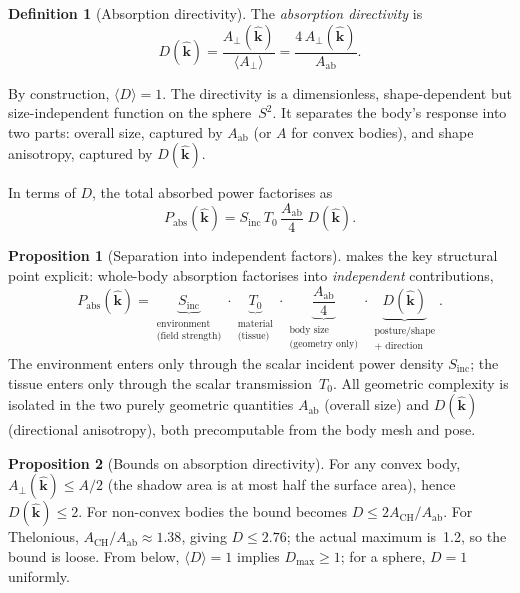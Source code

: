 \documentclass[11pt,a4paper]{article}
\theoremstyle{definition}      %
\newtheorem{proposition}[proposition]{Proposition}
\newtheorem{definition}[definition]{Definition}
\newcommand{\khat}{\hat{\bm{k}}}
\newcommand{\Sinc}{S_{\mathrm{inc}}}
\newcommand{\Aab}{A_{\mathrm{ab}}}
\newcommand{\Aperp}{A_{\perp}}
\begin{document}
\begin{definition}[Absorption directivity]
The \emph{absorption directivity} is
\begin{equation}\label{eq:D-def}
  D(\khat) = \frac{\Aperp(\khat)}{\langle\Aperp\rangle}
  = \frac{4\,\Aperp(\khat)}{\Aab}.
\end{equation}
\end{definition}

By construction, $\langle D\rangle=1$.  The directivity is a
dimensionless, shape-dependent but size-independent function on the
sphere~$S^2$.  It separates the body's response into
two parts: overall size, captured by $\Aab$ (or $A$ for convex bodies), and
shape anisotropy, captured by $D(\khat)$.

In terms of $D$, the total absorbed power factorises as
\begin{equation}\label{eq:Pabs-D}
  \boxed{P_{\mathrm{abs}}(\khat) = \Sinc\,T_0\,
    \frac{\Aab}{4}\;D(\khat).}
\end{equation}

\begin{proposition}[Separation into independent factors]
 makes the key structural point explicit: whole-body
absorption factorises into \emph{independent} contributions,
\[
  P_{\mathrm{abs}}(\khat)
  = \underbrace{\Sinc}_{\substack{\text{environment}\\\text{(field strength)}}}
    \cdot \underbrace{T_0}_{\substack{\text{material}\\\text{(tissue)}}}
    \cdot \underbrace{\frac{\Aab}{4}}_{\substack{\text{body size}\\\text{(geometry only)}}}
    \cdot \underbrace{D(\khat)}_{\substack{\text{posture/shape}\\\text{$+$ direction}}}.
\]
The environment enters only through the scalar incident power density
$\Sinc$; the tissue enters only through the scalar transmission~$T_0$.
All geometric complexity is isolated in the two purely geometric
quantities $\Aab$ (overall size) and $D(\khat)$ (directional anisotropy),
both precomputable from the body mesh and pose.
\end{proposition}

\begin{proposition}[Bounds on absorption directivity]
For any convex body, $\Aperp(\khat)\le A/2$ (the shadow area is at
most half the surface area), hence $D(\khat)\le 2$.  For non-convex
bodies the bound becomes $D\le 2A_{\mathrm{CH}}/\Aab$.
For Thelonious, $A_{\mathrm{CH}}/\Aab\approx 1.38$, giving
$D\le 2.76$; the actual maximum is~1.2, so the bound is loose.  From below, $\langle D\rangle=1$ implies
$D_{\max}\ge 1$; for a sphere, $D=1$ uniformly.
\end{proposition}
\end{document}
